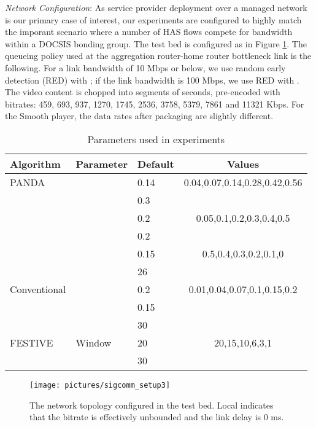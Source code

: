 \documentclass[conference]{IEEEtran}
\providecommand{\tabularnewline}{\\}
\theoremstyle{plain}
\theoremstyle{definition}
\theoremstyle{plain}
\theoremstyle{plain}
\providecommand{\tabularnewline}{\\}
\begin{document}
\emph{Network} \emph{Configuration}: As service provider deployment
over a managed network is our primary case of interest, our experiments
are configured to highly match the imporant scenario where a number
of HAS flows compete for bandwidth within a DOCSIS bonding group.
The test bed is configured as in Figure \ref{Flo:testbed_network}.
The queueing policy used at the aggregation router-home router bottleneck
link is the following. For a link bandwidth of 10 Mbps or below, we
use random early detection (RED) with ;
if the link bandwidth is 100 Mbps, we use RED with .
The video content is chopped into segments of  seconds, pre-encoded
with  bitrates: 459, 693, 937, 1270, 1745, 2536, 3758, 5379,
7861 and 11321 Kbps. For the Smooth player, the data rates after packaging
are slightly different.

\begin{center}
\begin{table}[t]
\scriptsize\vspace{0.10in}\begin{minipage}[t]{0.99\columnwidth}\begin{center}
{\small }\begin{tabular}{|l|l|l|c|}
\hline 
Algorithm & Parameter & Default & Values\tabularnewline
\hline 
PANDA &  & 0.14 & 0.04,0.07,0.14,0.28,0.42,0.56\tabularnewline
 &  & 0.3 & \tabularnewline
 &  & 0.2 & 0.05,0.1,0.2,0.3,0.4,0.5\tabularnewline
 &  & 0.2 & \tabularnewline
 &  & 0.15 & 0.5,0.4,0.3,0.2,0.1,0\tabularnewline
 &  & 26 & \tabularnewline
\hline 
Conventional &  & 0.2 & 0.01,0.04,0.07,0.1,0.15,0.2\tabularnewline
 &  & 0.15 & \tabularnewline
 &  & 30 & \tabularnewline
\hline 
FESTIVE & Window & 20 & 20,15,10,6,3,1\tabularnewline
 &  & 30 & \tabularnewline
\hline 
\end{tabular}
\par\end{center}\end{minipage}\caption{\label{tab:parameters}Parameters used in experiments}
\vspace{-0.05in}
\end{table}

\par\end{center}

\begin{figure}
\begin{centering}
\texttt{[image: pictures/sigcomm\_setup3]} \vspace{-0.05in}

\par\end{centering}

\centering{}\caption{The network topology configured in the test bed. Local indicates that
the bitrate is effectively unbounded and the link delay is 0 ms.}


\label{Flo:testbed_network} \vspace{-0.1in}
\end{figure}
\end{document}
